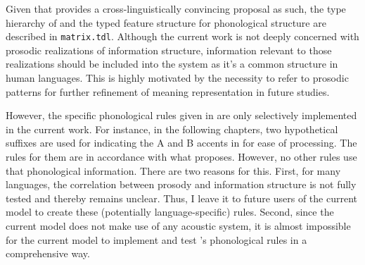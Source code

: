 \newpage 
{}



Given that \citet{bildhauer:07} provides a cross-linguistically
convincing proposal as such, the type hierarchy of  and the
typed feature structure for phonological structure are described in
\texttt{matrix.tdl}.  Although the current work is not deeply
concerned with prosodic realizations of information structure,
information relevant to those realizations should be included into the
system as it's a common structure in human languages. This is highly
motivated by the necessity to refer to prosodic patterns for further
refinement of meaning representation in future studies.



However, the specific phonological rules given in
 are only selectively implemented in the
current work. For instance, in the following chapters, two
hypothetical suffixes are used for indicating the A and B accents in
 for ease of processing.  The rules for them are in
accordance with what \citet{bildhauer:07} proposes. However, no other
rules use that phonological information. There are two reasons for
this. First, for many languages, the correlation between
prosody and information structure is not fully tested and thereby
remains unclear. Thus, I leave it to future users of the current model
to create these (potentially language-specific) rules. Second, since
the current model does not make use of any acoustic system, it is
almost impossible for the current model to implement and test
\citeauthor{bildhauer:07}'s phonological rules in a comprehensive way.

